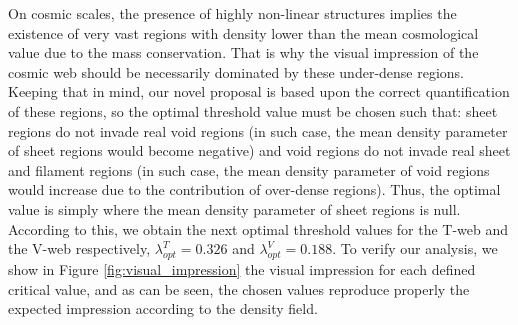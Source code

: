 \documentclass[a4,useAMS,usenatbib,usegraphicx]{latex/mn2e}
\begin{document}
On cosmic scales, the presence of highly non-linear structures implies the 
existence of very vast regions with density lower than the mean 
cosmological value due to the mass conservation. That is why the visual 
impression of the cosmic web should be necessarily dominated by these 
under-dense regions. Keeping that in mind, our novel proposal is based upon
the correct quantification of these regions, so the optimal threshold 
value must be chosen such that: sheet regions do not invade real void 
regions (in such case, the mean density parameter of sheet regions would 
become negative) and void regions do not invade real sheet and filament 
regions (in such case, the mean density parameter of void regions would 
increase due to the contribution of over-dense regions). Thus, the optimal 
value is simply where the mean density parameter of sheet regions is 
null. According to this, we obtain the next optimal threshold values 
for the T-web and the V-web respectively, $\lambda_{opt}^T = 0.326$ and 
$\lambda_{opt}^V = 0.188$. To verify our analysis, we show in Figure 
\ref{fig:visual_impression} the visual impression for each defined critical 
value, and as can be seen, the chosen values reproduce properly the 
expected impression according to the density field. 
\end{document}
